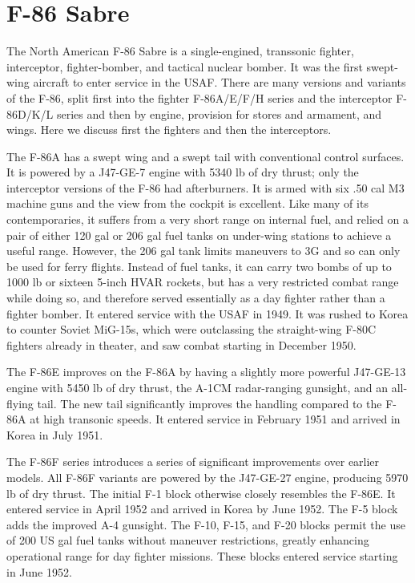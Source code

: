 \section*{F-86 Sabre}

The North American F-86 Sabre is a single-engined, transsonic fighter, interceptor, fighter-bomber, and tactical nuclear bomber. It was the first swept-wing aircraft to enter service in the USAF. There are many versions and variants of the F-86, split first into the fighter F-86A/E/F/H series and the interceptor F-86D/K/L series and then by engine, provision for stores and armament, and wings. Here we discuss first the fighters and then the interceptors.

The F-86A has a swept wing and a swept tail with conventional control surfaces. It is powered by a J47-GE-7 engine with 5340 lb of dry thrust; only the interceptor versions of the F-86 had afterburners. It is armed with six .50 cal M3 machine guns and the view from the cockpit is excellent. Like many of its contemporaries, it suffers from a very short range on internal fuel, and relied on a pair of either 120 gal or 206 gal fuel tanks on under-wing stations to achieve a useful range. However, the 206 gal tank limits maneuvers to 3G and so can only be used for ferry flights. Instead of fuel tanks, it can carry two bombs of up to 1000 lb or sixteen 5-inch HVAR rockets, but has a very restricted combat range while doing so, and therefore served essentially as a day fighter rather than a fighter bomber. It entered service with the USAF in 1949. It was rushed to Korea to counter Soviet MiG-15s, which were outclassing the straight-wing F-80C fighters already in theater, and saw combat starting in December 1950.

The F-86E improves on the F-86A by having a slightly more powerful J47-GE-13 engine with 5450 lb of dry thrust, the A-1CM radar-ranging gunsight, and an all-flying tail. The new tail significantly improves the handling compared to the F-86A at high transonic speeds. It entered service in February 1951 and arrived in Korea in July 1951.

The F-86F series introduces a series of significant improvements over earlier models. All F-86F variants are powered by the J47-GE-27 engine, producing 5970 lb of dry thrust. The initial F-1 block otherwise closely resembles the F-86E. It entered service in April 1952 and arrived in Korea by June 1952. The F-5 block adds the improved A-4 gunsight. The F-10, F-15, and F-20 blocks permit the use of 200 US gal fuel tanks without maneuver restrictions, greatly enhancing operational range for day fighter missions. These blocks entered service starting in June 1952.

